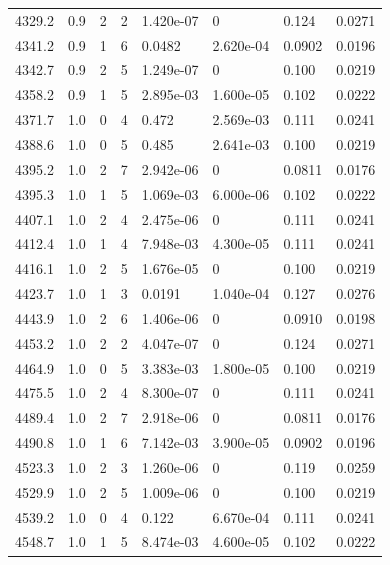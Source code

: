 \documentclass[preview]{standalone}
\begin{document}
{{{{{{{{{{{\begin{tabular}{L{1.2cm}C{1.2cm} C{0.3cm}C{0.5cm} C{1.4cm}C{1.4cm} C{1.4cm}C{1.4cm}}
  4329.2  &   0.9  & 2     &  2 &  1.420e-07  & 0  & 0.124 &  0.0271   \\ 
  4341.2  &   0.9  & 1     &  6 &  0.0482  & 2.620e-04  & 0.0902 &  0.0196   \\ 
  4342.7  &   0.9  & 2     &  5 &  1.249e-07  & 0  & 0.100 &  0.0219   \\ 
  4358.2  &   0.9  & 1     &  5 &  2.895e-03  & 1.600e-05  & 0.102 &  0.0222   \\ 
  4371.7  &   1.0  & 0     &  4 &  0.472  & 2.569e-03  & 0.111 &  0.0241   \\ 
  4388.6  &   1.0  & 0     &  5 &  0.485  & 2.641e-03  & 0.100 &  0.0219   \\ 
  4395.2  &   1.0  & 2     &  7 &  2.942e-06  & 0  & 0.0811 &  0.0176   \\ 
  4395.3  &   1.0  & 1     &  5 &  1.069e-03  & 6.000e-06  & 0.102 &  0.0222   \\ 
  4407.1  &   1.0  & 2     &  4 &  2.475e-06  & 0  & 0.111 &  0.0241   \\ 
  4412.4  &   1.0  & 1     &  4 &  7.948e-03  & 4.300e-05  & 0.111 &  0.0241   \\ 
  4416.1  &   1.0  & 2     &  5 &  1.676e-05  & 0  & 0.100 &  0.0219   \\ 
  4423.7  &   1.0  & 1     &  3 &  0.0191  & 1.040e-04  & 0.127 &  0.0276   \\ 
  4443.9  &   1.0  & 2     &  6 &  1.406e-06  & 0  & 0.0910 &  0.0198   \\ 
  4453.2  &   1.0  & 2     &  2 &  4.047e-07  & 0  & 0.124 &  0.0271   \\ 
  4464.9  &   1.0  & 0     &  5 &  3.383e-03  & 1.800e-05  & 0.100 &  0.0219   \\ 
  4475.5  &   1.0  & 2     &  4 &  8.300e-07  & 0  & 0.111 &  0.0241   \\ 
  4489.4  &   1.0  & 2     &  7 &  2.918e-06  & 0  & 0.0811 &  0.0176   \\ 
  4490.8  &   1.0  & 1     &  6 &  7.142e-03  & 3.900e-05  & 0.0902 &  0.0196   \\ 
  4523.3  &   1.0  & 2     &  3 &  1.260e-06  & 0  & 0.119 &  0.0259   \\ 
  4529.9  &   1.0  & 2     &  5 &  1.009e-06  & 0  & 0.100 &  0.0219   \\ 
  4539.2  &   1.0  & 0     &  4 &  0.122  & 6.670e-04  & 0.111 &  0.0241   \\ 
  4548.7  &   1.0  & 1     &  5 &  8.474e-03  & 4.600e-05  & 0.102 &  0.0222   \\ 

\end{tabular}}}}}}}}}}}}
\end{document}
